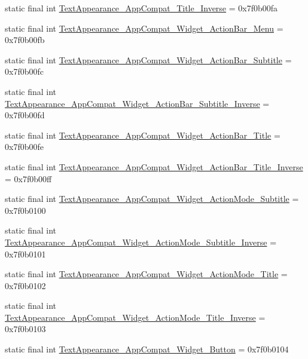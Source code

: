 \begin{CompactItemize}
\item 
static final int \hyperlink{classandroid_1_1support_1_1v7_1_1palette_1_1_r_1_1style_a2dbecea3118c13370d6f49004cd15a2}{TextAppearance\_\-AppCompat\_\-Title\_\-Inverse} = 0x7f0b00fa
\item 
static final int \hyperlink{classandroid_1_1support_1_1v7_1_1palette_1_1_r_1_1style_805738ac1c9e2fb4093ccf15cfad2720}{TextAppearance\_\-AppCompat\_\-Widget\_\-ActionBar\_\-Menu} = 0x7f0b00fb
\item 
static final int \hyperlink{classandroid_1_1support_1_1v7_1_1palette_1_1_r_1_1style_e9b204a120339aa251395b697ff6d198}{TextAppearance\_\-AppCompat\_\-Widget\_\-ActionBar\_\-Subtitle} = 0x7f0b00fc
\item 
static final int \hyperlink{classandroid_1_1support_1_1v7_1_1palette_1_1_r_1_1style_3eb9bb8d5bcacb47efc5f4714afe95c1}{TextAppearance\_\-AppCompat\_\-Widget\_\-ActionBar\_\-Subtitle\_\-Inverse} = 0x7f0b00fd
\item 
static final int \hyperlink{classandroid_1_1support_1_1v7_1_1palette_1_1_r_1_1style_e5135ccdd368eb7840c3a58b790eb5be}{TextAppearance\_\-AppCompat\_\-Widget\_\-ActionBar\_\-Title} = 0x7f0b00fe
\item 
static final int \hyperlink{classandroid_1_1support_1_1v7_1_1palette_1_1_r_1_1style_b61cff6c82c346af89510961f77efced}{TextAppearance\_\-AppCompat\_\-Widget\_\-ActionBar\_\-Title\_\-Inverse} = 0x7f0b00ff
\item 
static final int \hyperlink{classandroid_1_1support_1_1v7_1_1palette_1_1_r_1_1style_456c4310aa2413a07075912e8768976d}{TextAppearance\_\-AppCompat\_\-Widget\_\-ActionMode\_\-Subtitle} = 0x7f0b0100
\item 
static final int \hyperlink{classandroid_1_1support_1_1v7_1_1palette_1_1_r_1_1style_3e0050c4b4d821237efc4e270fd651c8}{TextAppearance\_\-AppCompat\_\-Widget\_\-ActionMode\_\-Subtitle\_\-Inverse} = 0x7f0b0101
\item 
static final int \hyperlink{classandroid_1_1support_1_1v7_1_1palette_1_1_r_1_1style_f12da189b90183baeef2c844cdd47177}{TextAppearance\_\-AppCompat\_\-Widget\_\-ActionMode\_\-Title} = 0x7f0b0102
\item 
static final int \hyperlink{classandroid_1_1support_1_1v7_1_1palette_1_1_r_1_1style_e2c240606ffeedcb74c8488119df3210}{TextAppearance\_\-AppCompat\_\-Widget\_\-ActionMode\_\-Title\_\-Inverse} = 0x7f0b0103
\item 
static final int \hyperlink{classandroid_1_1support_1_1v7_1_1palette_1_1_r_1_1style_bc947d22500a739d5bfa61a50a50506f}{TextAppearance\_\-AppCompat\_\-Widget\_\-Button} = 0x7f0b0104

\end{CompactItemize}
